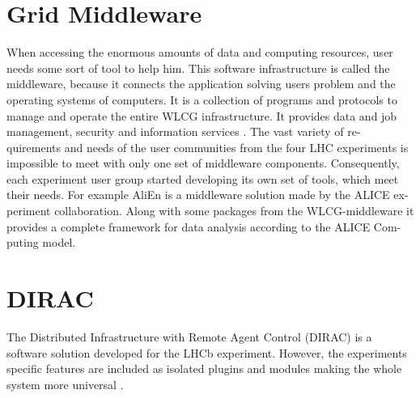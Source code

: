 \section*{Grid Middleware}
When accessing the enormous amounts of data and computing resources, user needs some sort of tool to help him. This software infrastructure is called the middleware, because it connects the application solving users problem and the operating systems of computers. It is a collection of programs and protocols to manage and operate the entire WLCG infrastructure. It provides data and job management, security and information services \cite{GriCom}. The vast variety of re- quirements and needs of the user communities from the four LHC experiments is impossible to meet with only one set of middleware components. Consequently, each experiment user group started developing its own set of tools, which meet their needs. For example AliEn is a middleware solution made by the ALICE ex- periment collaboration. Along with some packages from the WLCG-middleware it provides a complete framework for data analysis according to the ALICE Com- puting model.

\section*{DIRAC}
The Distributed Infrastructure with Remote Agent Control (DIRAC) is a software solution developed for the LHCb experiment. However, the experiments specific features are included as isolated plugins and modules making the whole system more universal \cite{Dir1}.